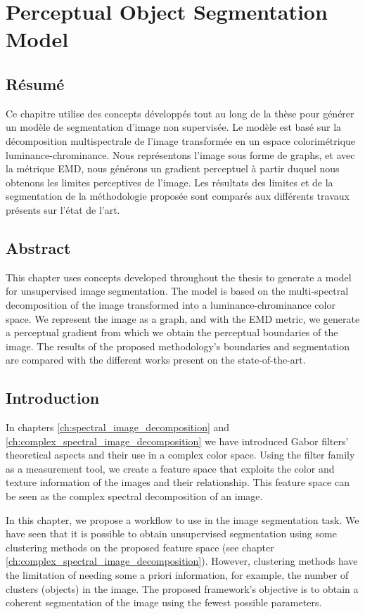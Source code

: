 
\chapter{Perceptual Object Segmentation Model} \label{ch:perceptual_object_boundaries_detection}

\section*{Résumé}
\noindent Ce chapitre utilise des concepts développés tout au long de la thèse pour générer un modèle de segmentation d'image non supervisée. Le modèle est basé sur la décomposition multispectrale de l'image transformée en un espace colorimétrique luminance-chrominance. Nous représentons l'image sous forme de graphs, et avec la métrique EMD, nous générons un gradient perceptuel à partir duquel nous obtenons les limites perceptives de l'image. Les résultats des limites et de la segmentation de la méthodologie proposée sont comparés aux différents travaux présents sur l'état de l'art.
\section*{Abstract}
\noindent This chapter uses concepts developed throughout the thesis to generate a model for unsupervised image segmentation. The model is based on the multi-spectral decomposition of the image transformed into a luminance-chrominance color space. We represent the image as a graph, and with the EMD metric, we generate a perceptual gradient from which we obtain the perceptual boundaries of the image. The results of the proposed methodology's boundaries and segmentation are compared with the different works present on the state-of-the-art. 

\section{Introduction}
In chapters \ref{ch:spectral_image_decomposition} and \ref{ch:complex_spectral_image_decomposition} we have introduced Gabor filters' theoretical aspects and their use in a complex color space. Using the filter family as a measurement tool, we create a feature space that exploits the color and texture information of the images and their relationship. This feature space can be seen as the complex spectral decomposition of an image.

In this chapter, we propose a workflow to use in the image segmentation task. We have seen that it is possible to obtain unsupervised segmentation using some clustering methods on the proposed feature space (see chapter \ref{ch:complex_spectral_image_decomposition}). However, clustering methods have the limitation of needing some a priori information, for example, the number of clusters (objects) in the image. The proposed framework's objective is to obtain a coherent segmentation of the image using the fewest possible parameters. 

